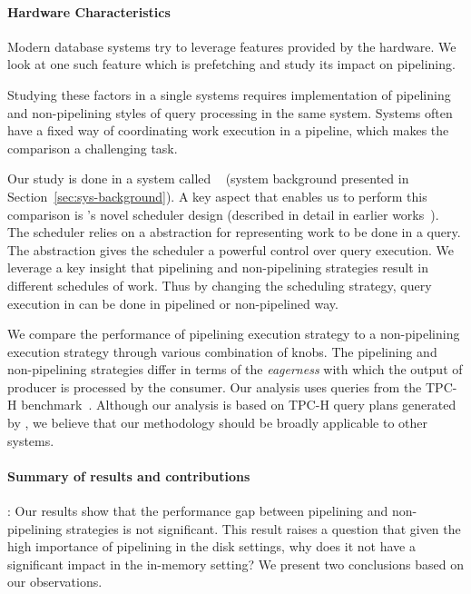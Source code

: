 \paragraph*{\textbf{Hardware Characteristics}}
Modern database systems try to leverage features provided by the hardware.
We look at one such feature which is prefetching and study its impact on pipelining.

Studying these factors in a single systems requires implementation of pipelining and non-pipelining styles of query processing in the same system.
Systems often have a fixed way of coordinating work execution in a pipeline, which makes the comparison a challenging task. 

Our study is done in a system called \sys{}~\cite{quickstep-system} (system background presented in Section~\ref{sec:sys-background}).
A key aspect that enables us to perform this comparison is \sys{}'s novel scheduler design (described in detail in earlier works~\cite{quickstep-system, DBLP:conf/bigdata/DeshmukhMP17}).
The scheduler relies on a \wo{} abstraction for representing work to be done in a query.
The \wo{} abstraction gives the \sys{} scheduler a powerful control over query execution.
We leverage a key insight that pipelining and non-pipelining strategies result in different schedules of work.
Thus by changing the scheduling strategy, query execution in \sys{} can be done in pipelined or non-pipelined way. 

We compare the performance of pipelining execution strategy to a non-pipelining execution strategy through various combination of knobs. %
The pipelining and non-pipelining strategies differ in terms of the \textit{eagerness} with which the output of producer is processed by the consumer.
Our analysis uses queries from the TPC-H benchmark~\cite{tpc-h}. 
Although our analysis is based on TPC-H query plans generated by \sys{}, we believe that our methodology should be broadly applicable to other systems.

\paragraph*{\bf{Summary of results and contributions}}:
Our results show that the performance gap between pipelining and non-pipelining strategies is not significant.
This result raises a question that given the high importance of pipelining in the disk settings, why does it not have a significant impact in the in-memory setting?
We present two conclusions based on our observations.

